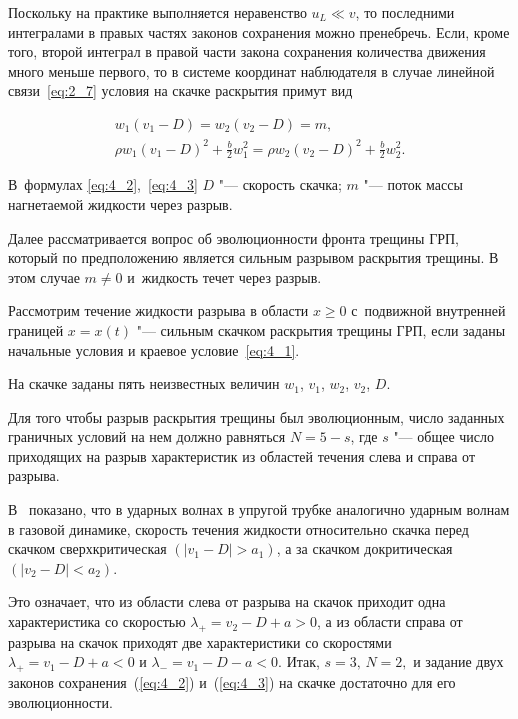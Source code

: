 Поскольку на практике выполняется неравенство $u_L \ll v$, то последними интегралами в правых частях законов сохранения можно пренебречь. Если, кроме того, второй интеграл в правой части закона сохранения количества движения много меньше первого, то в системе координат наблюдателя в случае линейной связи~\eqref{eq:2_7} условия на скачке раскрытия примут вид

\begin{gather}

w_1 \left(v_1 - D\right) =w_2 \left(v_2 - D\right) = m , \label{eq:4_2} \\

\rho w_1 \left(v_1 - D\right)^2 + \frac{b}{2} w_1^2 =\rho w_2 \left(v_2 - D\right)^2 + \frac{b}{2} w_2^2 . \label{eq:4_3} 

\end{gather}

В~формулах \eqref{eq:4_2},~\eqref{eq:4_3} $D$ "--- скорость скачка; $m$ "--- поток массы нагнетаемой жидкости через разрыв. 



Далее рассматривается вопрос об эволюционности фронта трещины ГРП, который по предположению является сильным разрывом раскрытия трещины. В этом случае $m \neq 0$ и~жидкость течет через разрыв. 

Рассмотрим течение жидкости разрыва в области $x \geq 0$  с~подвижной внутренней границей ${x = x(t)}$ "--- сильным скачком раскрытия трещины ГРП, если заданы начальные условия и краевое условие~\eqref{eq:4_1}. 

На скачке заданы пять неизвестных величин $w_1$, $v_1$, $w_2$, $v_2$, $D$. 

Для того чтобы разрыв раскрытия трещины был эволюционным, число заданных граничных условий на нем должно равняться $N= 5-s$, где $s$ "--- общее число приходящих на разрыв характеристик из областей течения слева и справа от разрыва. 



В~\cite{pedli1} показано, что в ударных волнах в упругой трубке аналогично ударным волнам в газовой динамике, скорость течения жидкости относительно скачка перед скачком сверхкритическая $\left(\left|v_1-D\right|> a_1\right)$, а за скачком докритическая $\left(\left|v_2-D\right|< a_2\right)$. 

Это означает, что из области слева от разрыва на скачок приходит одна характеристика со скоростью  $\lambda_+ = v_2 - D + a>0$, а из области справа от разрыва на скачок приходят две характеристики со скоростями $\lambda_+ = v_1 - D + a<0$ и $\lambda_- = v_1 - D - a<0$. Итак, $s=3,\, N=2,$ и задание двух законов сохранения~(\ref{eq:4_2}) и~(\ref{eq:4_3}) на скачке достаточно для его эволюционности. 



